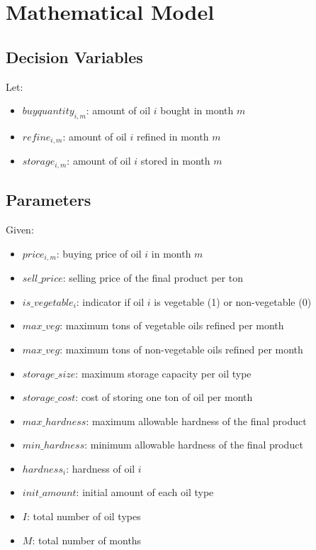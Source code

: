 \documentclass{article}
\begin{document}
\section*{Mathematical Model}

\subsection*{Decision Variables}
Let:
\begin{itemize}
    \item \( buyquantity_{i,m} \): amount of oil \( i \) bought in month \( m \)
    \item \( refine_{i,m} \): amount of oil \( i \) refined in month \( m \)
    \item \( storage_{i,m} \): amount of oil \( i \) stored in month \( m \)
\end{itemize}

\subsection*{Parameters}
Given:
\begin{itemize}
    \item \( price_{i,m} \): buying price of oil \( i \) in month \( m \)
    \item \( sell\_price \): selling price of the final product per ton
    \item \( is\_vegetable_{i} \): indicator if oil \( i \) is vegetable (1) or non-vegetable (0)
    \item \( max\_veg \): maximum tons of vegetable oils refined per month
    \item \( max\_veg \): maximum tons of non-vegetable oils refined per month
    \item \( storage\_size \): maximum storage capacity per oil type
    \item \( storage\_cost \): cost of storing one ton of oil per month
    \item \( max\_hardness \): maximum allowable hardness of the final product
    \item \( min\_hardness \): minimum allowable hardness of the final product
    \item \( hardness_{i} \): hardness of oil \( i \)
    \item \( init\_amount \): initial amount of each oil type
    \item \( I \): total number of oil types
    \item \( M \): total number of months
\end{itemize}
\end{document}
